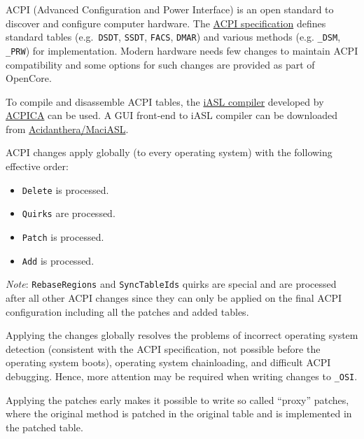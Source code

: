 \documentclass[]{article}
\providecommand{\tightlist}{%
  \setlength{\itemsep}{0pt}\setlength{\parskip}{0pt}}
\begin{document}
ACPI (Advanced Configuration and Power Interface) is an open standard to
discover and configure computer hardware.
The \href{https://uefi.org/specifications}{ACPI specification} defines
standard tables (e.g.~\texttt{DSDT}, \texttt{SSDT}, \texttt{FACS}, \texttt{DMAR})
and various methods (e.g. \texttt{\_DSM}, \texttt{\_PRW}) for implementation.
Modern hardware needs few changes to maintain ACPI compatibility and some
options for such changes are provided as part of OpenCore.

To compile and disassemble ACPI tables, the \href{https://github.com/acpica/acpica}{iASL compiler}
developed by \href{https://www.acpica.org}{ACPICA} can be used. A GUI front-end to iASL compiler
can be downloaded from \href{https://github.com/acidanthera/MaciASL/releases}{Acidanthera/MaciASL}.

ACPI changes apply globally (to every operating system) with the following effective order:

\begin{itemize}
\tightlist
\item \texttt{Delete} is processed.
\item \texttt{Quirks} are processed.
\item \texttt{Patch} is processed.
\item \texttt{Add} is processed.
\end{itemize}

\emph{Note}: \texttt{RebaseRegions} and \texttt{SyncTableIds} quirks are special and are processed after all other ACPI changes since they can only be applied on the final ACPI configuration including all the patches and added tables.

Applying the changes globally resolves the problems of incorrect operating system
detection (consistent with the ACPI specification, not possible before the operating
system boots), operating system chainloading, and difficult ACPI debugging. Hence,
more attention may be required when writing changes to \texttt{\_OSI}.

Applying the patches early makes it possible to write so called ``proxy'' patches,
where the original method is patched in the original table and is implemented in
the patched table.
\end{document}
